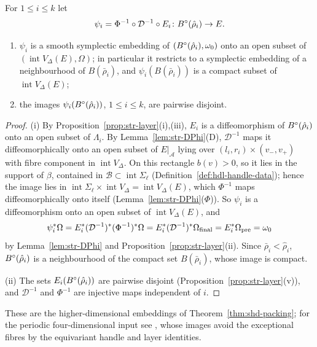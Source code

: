 \begin{proposition}\label{prop:str-embeddings}
For $1\le i\le k$ let
\[
 \psi_i=\Phi^{-1}\circ\mathcal D^{-1}\circ E_i\colon B^{\circ}(\hat\rho_i)\to E .
\]
\begin{enumerate}[label=(\roman*)]
\item $\psi_i$ is a smooth symplectic embedding of $(B^{\circ}(\hat\rho_i),\omega_0)$ onto an open subset of
$(\operatorname{int}V_\Delta(E),\Omega)$; in particular it restricts to a symplectic embedding of a neighbourhood of
$B(\bar\rho_i)$, and $\psi_i(B(\bar\rho_i))$ is a compact subset of $\operatorname{int}V_\Delta(E)$;
\item the images $\psi_i(B^{\circ}(\hat\rho_i))$, $1\le i\le k$, are pairwise disjoint.
\end{enumerate}
\end{proposition}

\begin{proof}
(i) By Proposition~\ref{prop:str-layer}(i),(iii), $E_i$ is a diffeomorphism of $B^{\circ}(\hat\rho_i)$ onto an open subset of
$\Lambda_i$. By Lemma~\ref{lem:str-DPhi}(D), $\mathcal D^{-1}$ maps it diffeomorphically onto an open subset of
$E|_{\mathcal A}$ lying over $(l_i,r_i)\times(v_-,v_+)$ with fibre component in $\operatorname{int}V_\Delta$. On this rectangle
$b(v)>0$, so it lies in the support of $\beta$, contained in $\mathcal B\subset\operatorname{int}\Sigma_\ell$
(Definition~\ref{def:hdl-handle-data}); hence the image lies in $\operatorname{int}\Sigma_\ell\times\operatorname{int}V_\Delta
=\operatorname{int}V_\Delta(E)$, which $\Phi^{-1}$ maps diffeomorphically onto itself (Lemma~\ref{lem:str-DPhi}($\Phi$)). So
$\psi_i$ is a diffeomorphism onto an open subset of $\operatorname{int}V_\Delta(E)$, and
\[
 \psi_i^*\Omega=E_i^*(\mathcal D^{-1})^*(\Phi^{-1})^*\Omega=E_i^*(\mathcal D^{-1})^*\Omega_{\rm final}=E_i^*\Omega_{\rm pre}=\omega_0
\]
by Lemma~\ref{lem:str-DPhi} and Proposition~\ref{prop:str-layer}(ii). Since $\bar\rho_i<\hat\rho_i$, $B^{\circ}(\hat\rho_i)$ is a
neighbourhood of the compact set $B(\bar\rho_i)$, whose image is compact.

(ii) The sets $E_i(B^{\circ}(\hat\rho_i))$ are pairwise disjoint (Proposition~\ref{prop:str-layer}(v)), and $\mathcal D^{-1}$ and
$\Phi^{-1}$ are injective maps independent of $i$.
\end{proof}

These are the higher-dimensional embeddings of Theorem~\ref{thm:shd-packing}; for the periodic four-dimensional input
see , whose images avoid the exceptional fibres by the equivariant handle and layer identities.
